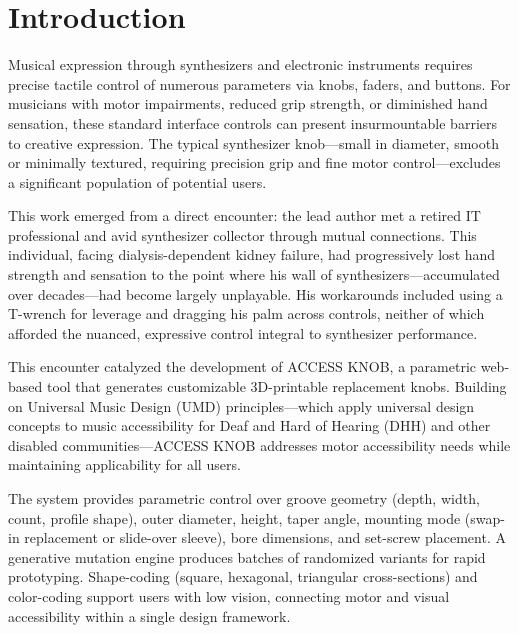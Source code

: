 \documentclass[sigconf]{nimeart}
\begin{document}


\maketitle

\section{Introduction}

Musical expression through synthesizers and electronic instruments requires precise tactile control of numerous parameters via knobs, faders, and buttons. For musicians with motor impairments, reduced grip strength, or diminished hand sensation, these standard interface controls can present insurmountable barriers to creative expression. The typical synthesizer knob—small in diameter, smooth or minimally textured, requiring precision grip and fine motor control—excludes a significant population of potential users.

This work emerged from a direct encounter: the lead author met a retired IT professional and avid synthesizer collector through mutual connections. This individual, facing dialysis-dependent kidney failure, had progressively lost hand strength and sensation to the point where his wall of synthesizers—accumulated over decades—had become largely unplayable. His workarounds included using a T-wrench for leverage and dragging his palm across controls, neither of which afforded the nuanced, expressive control integral to synthesizer performance.

This encounter catalyzed the development of ACCESS KNOB, a parametric web-based tool that generates customizable 3D-printable replacement knobs. Building on Universal Music Design (UMD) principles\cite{hergert2024gestolumina,cavdir2024sonic}—which apply universal design concepts to music accessibility for Deaf and Hard of Hearing (DHH) and other disabled communities—ACCESS KNOB addresses motor accessibility needs while maintaining applicability for all users.

The system provides parametric control over groove geometry (depth, width, count, profile shape), outer diameter, height, taper angle, mounting mode (swap-in replacement or slide-over sleeve), bore dimensions, and set-screw placement. A generative mutation engine produces batches of randomized variants for rapid prototyping. Shape-coding (square, hexagonal, triangular cross-sections) and color-coding support users with low vision, connecting motor and visual accessibility within a single design framework.
\end{document}

